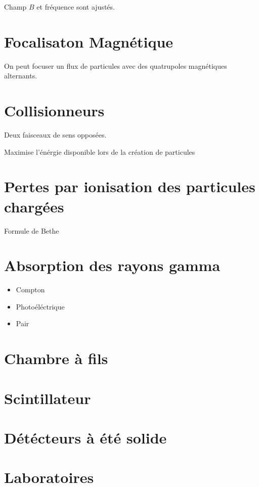 Champ $B$ et fréquence sont ajustés. 


\section*{Focalisaton Magnétique}

On peut focuser un flux de particules avec des quatrupoles magnétiques alternants.

\section*{Collisionneurs}
Deux faisceaux de sens opposées.

Maximise l'énérgie disponible lors de la création de particules



\section*{Pertes par ionisation des particules chargées}

Formule de Bethe


\section*{Absorption des rayons gamma}
\begin{itemize}
	\item Compton
	\item Photoéléctrique
	\item Pair
\end{itemize}


\section*{Chambre à fils}


\section*{Scintillateur}

\section*{Détécteurs à été solide }

\section*{Laboratoires}

